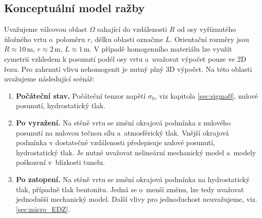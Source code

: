 \documentclass{article}
\def\jb#1{{\color{violet}#1}}
\newcommand{\sy}[1]{{\color{blue} SS: #1}}
\begin{document}
\subsection{Konceptuální model ražby}
Uvažujeme válcovou oblast $\Omega$ sahající do vzdálenosti $R$ od osy vyříznutého úložného vrtu o~poloměru $r$, délku oblasti označme $L$. Orientační rozměry jsou $R\approx 10\,\mathrm{m}$, $r\approx 2\,\mathrm{m}$, $L\approx 1\,\mathrm{m}$. V případě homogenního materiálu lze využít symetrii vzhledem k posunutí podél osy vrtu a~uvažovat výpočet pouze ve 2D řezu. Pro zahrnutí vlivu nehomogenit je nutný plný 3D výpočet. Na této oblasti uvažujeme následující scénář:

\begin{enumerate}
\item {\bf Počáteční stav.} Počáteční tenzor napětí $\sigma_0$, viz kapitola \ref{sec:sigma0}, nulové posunutí, hydrostatický tlak.
                       
\item {\bf Po vyražení.} Na stěně vrtu se změní okrajová podmínka z nulového posunutí na nulovou tečnou sílu
                         a~atmosférický tlak. Vnější okrajová podmínka v dostatečné vzdálenosti předepisuje nulové posunutí, hydrostatický tlak.
                         Je nutné uvažovat nelineární mechanický model a~modely poškození v~blízkosti tunelu. 
                         

                         
\item {\bf Po zatopení.} Na stěně vrtu se změní okrajová podmínka na hydrostatický tlak, případně tlak bentonitu. Jedná se o~menší změnu, lze tedy uvažovat jednodušší mechanický model. Další vlivy pro jednoduchost neuvažujeme, viz. \ref{sec:micro_EDZ}.
                        
\end{enumerate}
\end{document}
